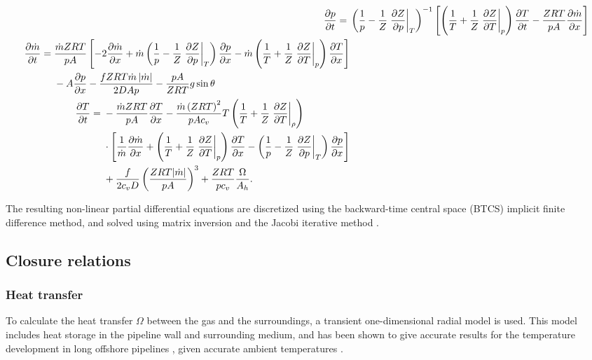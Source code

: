 {\allowdisplaybreaks %
\begin{align}
    \pdt{p} ={}& 
    \del{\frac{1}{p} - \frac{1}{Z} \eval{\dpd{Z}{p}}_T}^{-1}
    \sbr{
    \del{\frac{1}{T} + \frac{1}{Z}\eval{\dpd{Z}{T}}_p} \dpd{T}{t}
    - \frac{ZRT}{pA}\dpd{\dot m}{x}
    }
\label{eq:continuityEquation}
    \\
    \begin{split}
        \pdt{\dot m} ={}& \frac{\dot m ZRT}{pA} 
        \sbr{
            - 2\pdx{\dot m}
            + \dot m \del{\frac{1}{p} - \frac{1}{Z} \eval{\dpd{Z}{p}}_T} \pdx{p}
            - \dot m \del{\frac{1}{T} + \frac{1}{Z} \eval{\dpd{Z}{T}}_p} \pdx{T}
        }
        \\&
        {}- A\pdx{p}
        - \frac{fZRT \dot m \abs{\dot m}}{2DAp}
        - \frac{pA}{ZRT}g\sin\theta
    \end{split}
\label{eq:momentumEquation}
    \\
    \begin{split}
        \pdt{T} ={}&
        - \frac{\dot m ZRT}{pA}\pdx{T}
        - \frac{\dot m \del{ZRT}^2}{pAc_v}T \del{\frac{1}{T} + \frac{1}{Z}\eval{\dpd{Z}{T}}_\rho} \\
        &{}\times 
        \sbr{
            \frac{1}{\dot m}\dpd{\dot m}{x} 
            + \del{\frac{1}{T} + \frac{1}{Z}\eval{\dpd{Z}{T}}_p}\pdx{T}
            - \del{\frac{1}{p} - \frac{1}{Z}\eval{\dpd{Z}{p}}_T}\pdx{p}
        } \\
        &{}+ \frac{f}{2c_vD}\del{\frac{ZRT|\dot m|}{pA}}^3 
        + \frac{ZRT}{p c_v} \frac{\Omega}{A_h}
        .
    \end{split}
\label{eq:energyEquation}
\end{align}
}

The resulting non-linear partial differential equations are discretized using the backward-time central space (BTCS) implicit finite difference method, and solved using matrix inversion and the Jacobi iterative method \cite{Ferziger2002Computational}.

\subsection{Closure relations}
\subsubsection{Heat transfer}
To calculate the heat transfer $\Omega$ between the gas and the surroundings, a transient one-dimensional radial model \cite{Chaczykowski2010Transient} is used. This model includes heat storage in the pipeline wall and surrounding medium, and has been shown to give accurate results for the temperature development in long offshore pipelines \cite{Helgaker2014Validation,Oosterkamp2015Modelling,Oosterkamp2016Heat}, given accurate ambient temperatures \cite{Sund2015Pipeline}.

